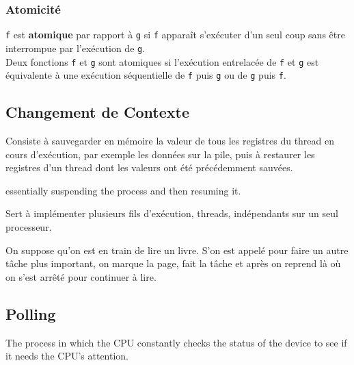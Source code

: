 \documentclass{article}
\begin{document}
\subsubsection{Atomicité}
\begin{definition}\label{def:atomicite}
    \texttt{f} est \textbf{atomique} par rapport à \texttt{g} si \texttt{f} apparaît s'exécuter d'un seul coup sans être interrompue par l'exécution de \texttt{g}.\\

    Deux fonctions \texttt{f} et \texttt{g} sont atomiques si l'exécution entrelacée de \texttt{f} et \texttt{g} est équivalente à une exécution séquentielle de \texttt{f} puis \texttt{g} ou de \texttt{g} puis \texttt{f}.
\end{definition}


\subsection{Changement de Contexte}
\begin{definition}
    Consiste à sauvegarder en mémoire la valeur de tous les registres du thread en cours d'exécution, par exemple les données sur la pile, puis à restaurer les registres d'un thread dont les valeurs ont été précédemment sauvées.

    \begin{phrase}
        essentially suspending the process and then resuming it.
    \end{phrase}

    \begin{remark}
        Sert à implémenter plusieurs fils d'exécution, threads, indépendants sur un seul processeur.
    \end{remark}

    \begin{example}
        On suppose qu'on est en train de lire un livre. S'on est appelé pour faire un autre tâche plus important, on marque la page, fait la tâche et après on reprend là où on s'est arrêté pour continuer à lire.
    \end{example}
\end{definition}


\subsection{Polling}
\begin{definition}
    The process in which the CPU constantly checks the status of the device to see if it needs the CPU's attention.
\end{definition}
\end{document}
